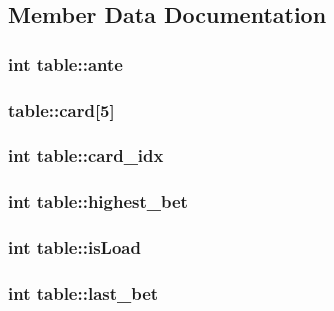 \subsection{Member Data Documentation}
\hypertarget{structtable_a9bc7be4e5c17f0275b75764d87ac3af7}{
\subsubsection[{ante}]{\setlength{\rightskip}{0pt plus 5cm}int table\+::ante}}\label{structtable_a9bc7be4e5c17f0275b75764d87ac3af7}
\hypertarget{structtable_a949f57fb489ea79e296dbccac40f19b3}{
\subsubsection[{card}]{ table\+::card\mbox{[}5\mbox{]}}}\label{structtable_a949f57fb489ea79e296dbccac40f19b3}
\hypertarget{structtable_ae74466d246cfcd247e0c4e49318edf8a}{
\subsubsection[{card\+\_\+idx}]{\setlength{\rightskip}{0pt plus 5cm}int table\+::card\+\_\+idx}}\label{structtable_ae74466d246cfcd247e0c4e49318edf8a}
\hypertarget{structtable_a50a5836f04eb5607ba290c98aa640767}{
\subsubsection[{highest\+\_\+bet}]{\setlength{\rightskip}{0pt plus 5cm}int table\+::highest\+\_\+bet}}\label{structtable_a50a5836f04eb5607ba290c98aa640767}
\hypertarget{structtable_ab1dd17260b838f195fd032c19bbd7ba5}{
\subsubsection[{is\+Load}]{\setlength{\rightskip}{0pt plus 5cm}int table\+::is\+Load}}\label{structtable_ab1dd17260b838f195fd032c19bbd7ba5}
\hypertarget{structtable_a4ca9edd8b9f6515674caaf6df7c621c0}{
\subsubsection[{last\+\_\+bet}]{\setlength{\rightskip}{0pt plus 5cm}int table\+::last\+\_\+bet}}\label{structtable_a4ca9edd8b9f6515674caaf6df7c621c0}
